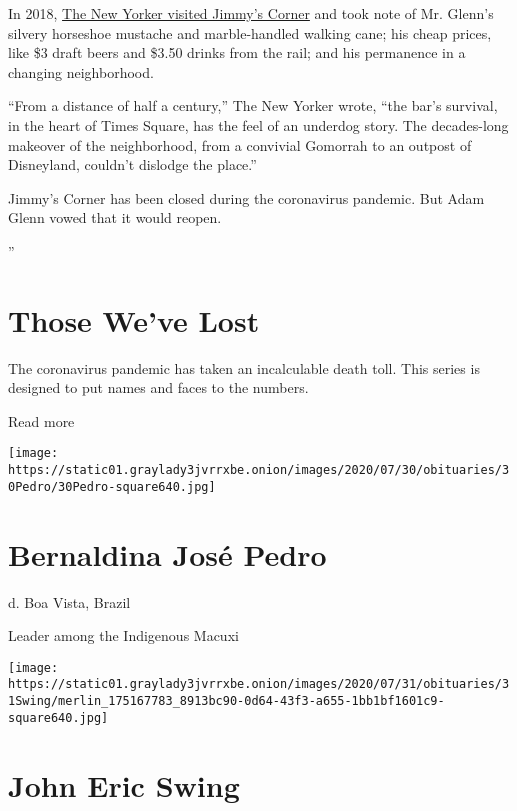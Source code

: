 In 2018,
\href{https://www.newyorker.com/magazine/2018/05/21/the-underdog-story-of-times-squares-still-gritty-jimmys-corner}{The
New Yorker visited Jimmy's Corner} and took note of Mr. Glenn's silvery
horseshoe mustache and marble-handled walking cane; his cheap prices,
like \$3 draft beers and \$3.50 drinks from the rail; and his permanence
in a changing neighborhood.

``From a distance of half a century,'' The New Yorker wrote, ``the bar's
survival, in the heart of Times Square, has the feel of an underdog
story. The decades-long makeover of the neighborhood, from a convivial
Gomorrah to an outpost of Disneyland, couldn't dislodge the place.''

Jimmy's Corner has been closed during the coronavirus pandemic. But Adam
Glenn vowed that it would reopen.

''

\href{https://www.nytimes3xbfgragh.onion/interactive/2020/obituaries/people-died-coronavirus-obituaries.html?action=click\&pgtype=Article\&state=default\&region=BELOW_MAIN_CONTENT\&context=covid_obits_promo}{}

\hypertarget{those-weve-lost}{%
\section{Those We've Lost}\label{those-weve-lost}}

The coronavirus pandemic has taken an incalculable death toll. This
series is designed to put names and faces to the numbers.

Read more

\texttt{[image: https://static01.graylady3jvrrxbe.onion/images/2020/07/30/obituaries/30Pedro/30Pedro-square640.jpg]}

\hypertarget{bernaldina-josuxe9-pedro}{%
\section{Bernaldina José Pedro}\label{bernaldina-josuxe9-pedro}}

d. Boa Vista, Brazil

Leader among the Indigenous Macuxi

\texttt{[image: https://static01.graylady3jvrrxbe.onion/images/2020/07/31/obituaries/31Swing/merlin\_175167783\_8913bc90-0d64-43f3-a655-1bb1bf1601c9-square640.jpg]}

\hypertarget{john-eric-swing}{%
\section{John Eric Swing}\label{john-eric-swing}}

